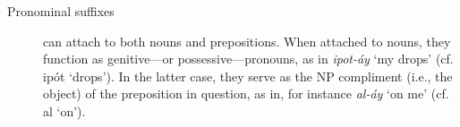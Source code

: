 {\begin{description}
\item[Pronominal suffixes] can attach to both nouns and prepositions. When attached to nouns, they function as genitive---or possessive---pronouns, as in \textit{ipot-\'{a}y} `my drops' (cf. ip\'{o}t `drops').
In the latter case, they serve as the NP compliment (i.e., the object) of the preposition 
in question, as in, for instance \textit{al-\'{a}y} `on me' (cf. al `on').
\begin{table}[ht!]
\centering
{}
\label{tab:pro-suffixes}
\caption{Pronominal suffixes}
\end{table}


\end{description}}
